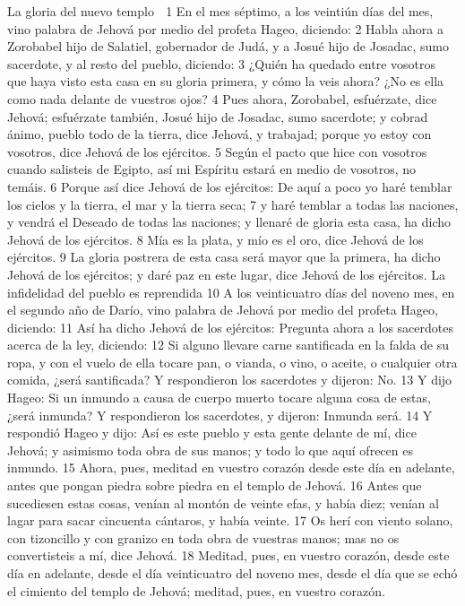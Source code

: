 La gloria del nuevo templo

1 En el mes séptimo, a los veintiún días del mes, vino palabra de Jehová por medio del profeta Hageo, diciendo:
2 Habla ahora a Zorobabel hijo de Salatiel, gobernador de Judá, y a Josué hijo de Josadac, sumo sacerdote, y al resto del pueblo, diciendo:
3 ¿Quién ha quedado entre vosotros que haya visto esta casa en su gloria primera, y cómo la veis ahora? ¿No es ella como nada delante de vuestros ojos?
4 Pues ahora, Zorobabel, esfuérzate, dice Jehová; esfuérzate también, Josué hijo de Josadac, sumo sacerdote; y cobrad ánimo, pueblo todo de la tierra, dice Jehová, y trabajad; porque yo estoy con vosotros, dice Jehová de los ejércitos.
5 Según el pacto que hice con vosotros cuando salisteis de Egipto, así mi Espíritu estará en medio de vosotros, no temáis.
6 Porque así dice Jehová de los ejércitos: De aquí a poco yo haré temblar los cielos y la tierra, el mar y la tierra seca;
7 y haré temblar a todas las naciones, y vendrá el Deseado de todas las naciones; y llenaré de gloria esta casa, ha dicho Jehová de los ejércitos.
8 Mía es la plata, y mío es el oro, dice Jehová de los ejércitos.
9 La gloria postrera de esta casa será mayor que la primera, ha dicho Jehová de los ejércitos; y daré paz en este lugar, dice Jehová de los ejércitos.
La infidelidad del pueblo es reprendida
10 A los veinticuatro días del noveno mes, en el segundo año de Darío, vino palabra de Jehová por medio del profeta Hageo, diciendo:
11 Así ha dicho Jehová de los ejércitos: Pregunta ahora a los sacerdotes acerca de la ley, diciendo:
12 Si alguno llevare carne santificada en la falda de su ropa, y con el vuelo de ella tocare pan, o vianda, o vino, o aceite, o cualquier otra comida, ¿será santificada? Y respondieron los sacerdotes y dijeron: No.
13 Y dijo Hageo: Si un inmundo a causa de cuerpo muerto tocare alguna cosa de estas, ¿será inmunda? Y respondieron los sacerdotes, y dijeron: Inmunda será.
14 Y respondió Hageo y dijo: Así es este pueblo y esta gente delante de mí, dice Jehová; y asimismo toda obra de sus manos; y todo lo que aquí ofrecen es inmundo.
15 Ahora, pues, meditad en vuestro corazón desde este día en adelante, antes que pongan piedra sobre piedra en el templo de Jehová. 
16 Antes que sucediesen estas cosas, venían al montón de veinte efas,  y había diez; venían al lagar para sacar cincuenta cántaros, y había veinte.
17 Os herí con viento solano, con tizoncillo y con granizo en toda obra de vuestras manos; mas no os convertisteis a mí, dice Jehová.
18 Meditad, pues, en vuestro corazón, desde este día en adelante, desde el día veinticuatro del noveno mes, desde el día que se echó el cimiento del templo de Jehová; meditad, pues, en vuestro corazón.
